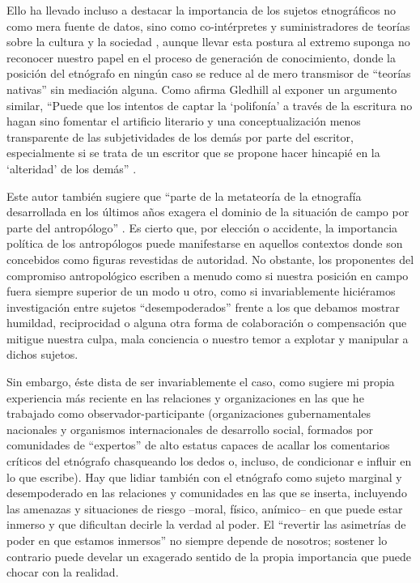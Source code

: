 \documentclass[
  spanish,
  11pt,
  a4paper,
]{scrbook}
\begin{document}
Ello ha llevado incluso a destacar la importancia de los sujetos
etnográficos no como mera fuente de datos, sino como co-intérpretes y
suministradores de teorías sobre la cultura y la sociedad
\autocite{Magazine2015}, aunque llevar esta postura al extremo suponga
no reconocer nuestro papel en el proceso de generación de conocimiento,
donde la posición del etnógrafo en ningún caso se reduce al de mero
transmisor de ``teorías nativas'' sin mediación alguna. Como afirma
Gledhill al exponer un argumento similar, ``Puede que los intentos de
captar la `polifonía' a través de la escritura no hagan sino fomentar el
artificio literario y una conceptualización menos transparente de las
subjetividades de los demás por parte del escritor, especialmente si se
trata de un escritor que se propone hacer hincapié en la `alteridad' de
los demás'' \autocite[377]{Gledhill2000}.

Este autor también sugiere que ``parte de la metateoría de la etnografía
desarrollada en los últimos años exagera el dominio de la situación de
campo por parte del antropólogo'' \autocite[373]{Gledhill2000}. Es
cierto que, por elección o accidente, la importancia política de los
antropólogos puede manifestarse en aquellos contextos donde son
concebidos como figuras revestidas de autoridad. No obstante, los
proponentes del compromiso antropológico escriben a menudo como si
nuestra posición en campo fuera siempre superior de un modo u otro, como
si invariablemente hiciéramos investigación entre sujetos
``desempoderados'' frente a los que debamos mostrar humildad,
reciprocidad o alguna otra forma de colaboración o compensación que
mitigue nuestra culpa, mala conciencia o nuestro temor a explotar y
manipular a dichos sujetos.

Sin embargo, éste dista de ser invariablemente el caso, como sugiere mi
propia experiencia más reciente en las relaciones y organizaciones en
las que he trabajado como observador-participante (organizaciones
gubernamentales nacionales y organismos internacionales de desarrollo
social, formados por comunidades de ``expertos'' de alto estatus capaces
de acallar los comentarios críticos del etnógrafo chasqueando los dedos
o, incluso, de condicionar e influir en lo que escribe). Hay que lidiar
también con el etnógrafo como sujeto marginal y desempoderado en las
relaciones y comunidades en las que se inserta, incluyendo las amenazas
y situaciones de riesgo --moral, físico, anímico-- en que puede estar
inmerso y que dificultan decirle la verdad al poder. El ``revertir las
asimetrías de poder en que estamos inmersos'' no siempre depende de
nosotros; sostener lo contrario puede develar un exagerado sentido de la
propia importancia que puede chocar con la realidad.
\end{document}
